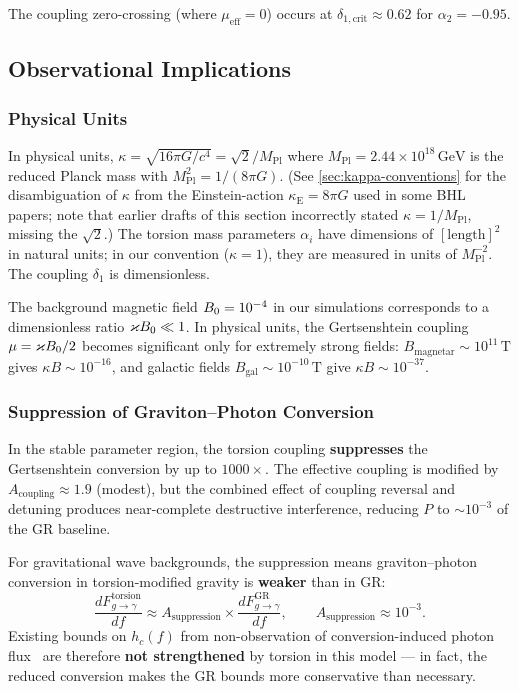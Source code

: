 The coupling zero-crossing (where $\mu_{\text{eff}} = 0$) occurs at $\delta_{1,\text{crit}} \approx 0.62$ for $\alpha_2 = -0.95$.

\subsection{Observational Implications}
\label{subsec:observational}

\subsubsection{Physical Units}

In physical units, $\kappa = \sqrt{16\pi G/c^4} = \sqrt{2}/M_{\text{Pl}}$ where $M_{\text{Pl}} = 2.44 \times 10^{18}\,\text{GeV}$ is the reduced Planck mass with $M_{\text{Pl}}^2 = 1/(8\pi G)$. (See \cref{sec:kappa-conventions} for the disambiguation of $\kappa$ from the Einstein-action $\kappa_\text{E} = 8\pi G$ used in some BHL papers; note that earlier drafts of this section incorrectly stated $\kappa = 1/M_{\text{Pl}}$, missing the $\sqrt{2}$.) The torsion mass parameters $\alpha_i$ have dimensions of $[\text{length}]^2$ in natural units; in our convention ($\kappa = 1$), they are measured in units of $M_{\text{Pl}}^{-2}$. The coupling $\delta_1$ is dimensionless.

The background magnetic field $B_0 = 10^{-4}$ in our simulations corresponds to a dimensionless ratio $\varkappa B_0 \ll 1$. In physical units, the Gertsenshtein coupling $\mu = \varkappa B_0 / 2$ becomes significant only for extremely strong fields: $B_{\text{magnetar}} \sim 10^{11}\,\text{T}$ gives $\kappa B \sim 10^{-16}$, and galactic fields $B_{\text{gal}} \sim 10^{-10}\,\text{T}$ give $\kappa B \sim 10^{-37}$.

\subsubsection{Suppression of Graviton--Photon Conversion}

In the stable parameter region, the torsion coupling \textbf{suppresses} the Gertsenshtein conversion by up to $1000\times$. The effective coupling is modified by $A_{\text{coupling}} \approx 1.9$ (modest), but the combined effect of coupling reversal and detuning produces near-complete destructive interference, reducing $P$ to $\sim 10^{-3}$ of the GR baseline.

For gravitational wave backgrounds, the suppression means graviton--photon conversion in torsion-modified gravity is \textbf{weaker} than in GR:
\begin{equation}
  \frac{dF_{g \to \gamma}^{\text{torsion}}}{df} \approx A_{\text{suppression}} \times \frac{dF_{g \to \gamma}^{\text{GR}}}{df}, \qquad A_{\text{suppression}} \approx 10^{-3}.
\end{equation}
Existing bounds on $h_c(f)$ from non-observation of conversion-induced photon flux~\cite{lella2024constraining} are therefore \textbf{not strengthened} by torsion in this model --- in fact, the reduced conversion makes the GR bounds more conservative than necessary.

